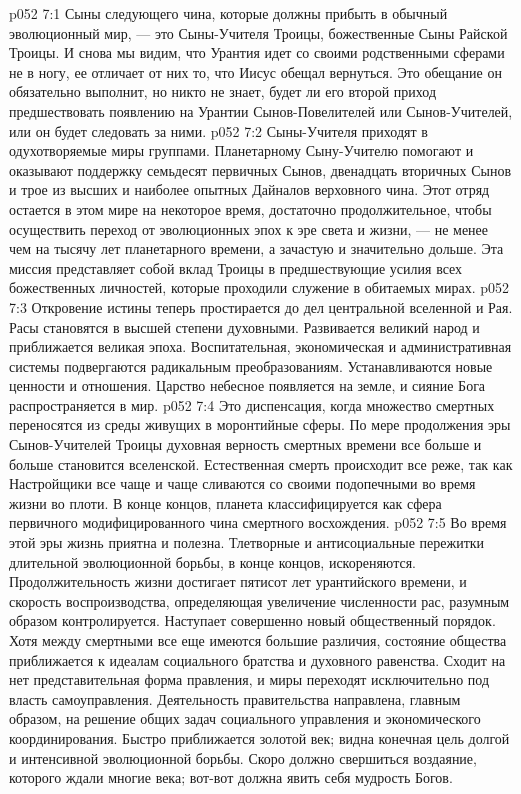 \vs p052 7:1 Сыны следующего чина, которые должны прибыть в обычный эволюционный мир, --- это Сыны\hyp{}Учителя Троицы, божественные Сыны Райской Троицы. И снова мы видим, что Урантия идет со своими родственными сферами не в ногу, ее отличает от них то, что Иисус обещал вернуться. Это обещание он обязательно выполнит, но никто не знает, будет ли его второй приход предшествовать появлению на Урантии Сынов\hyp{}Повелителей или Сынов\hyp{}Учителей, или он будет следовать за ними.
\vs p052 7:2 Сыны\hyp{}Учителя приходят в одухотворяемые миры группами. Планетарному Сыну\hyp{}Учителю помогают и оказывают поддержку семьдесят первичных Сынов, двенадцать вторичных Сынов и трое из высших и наиболее опытных Дайналов верховного чина. Этот отряд остается в этом мире на некоторое время, достаточно продолжительное, чтобы осуществить переход от эволюционных эпох к эре света и жизни, --- не менее чем на тысячу лет планетарного времени, а зачастую и значительно дольше. Эта миссия представляет собой вклад Троицы в предшествующие усилия всех божественных личностей, которые проходили служение в обитаемых мирах.
\vs p052 7:3 \pc Откровение истины теперь простирается до дел центральной вселенной и Рая. Расы становятся в высшей степени духовными. Развивается великий народ и приближается великая эпоха. Воспитательная, экономическая и административная системы подвергаются радикальным преобразованиям. Устанавливаются новые ценности и отношения. Царство небесное появляется на земле, и сияние Бога распространяется в мир.
\vs p052 7:4 Это диспенсация, когда множество смертных переносятся из среды живущих в моронтийные сферы. По мере продолжения эры Сынов\hyp{}Учителей Троицы духовная верность смертных времени все больше и больше становится вселенской. Естественная смерть происходит все реже, так как Настройщики все чаще и чаще сливаются со своими подопечными во время жизни во плоти. В конце концов, планета классифицируется как сфера первичного модифицированного чина смертного восхождения.
\vs p052 7:5 \pc Во время этой эры жизнь приятна и полезна. Тлетворные и антисоциальные пережитки длительной эволюционной борьбы, в конце концов, искореняются. Продолжительность жизни достигает пятисот лет урантийского времени, и скорость воспроизводства, определяющая увеличение численности рас, разумным образом контролируется. Наступает совершенно новый общественный порядок. Хотя между смертными все еще имеются большие различия, состояние общества приближается к идеалам социального братства и духовного равенства. Сходит на нет представительная форма правления, и миры переходят исключительно под власть самоуправления. Деятельность правительства направлена, главным образом, на решение общих задач социального управления и экономического координирования. Быстро приближается золотой век; видна конечная цель долгой и интенсивной эволюционной борьбы. Скоро должно свершиться воздаяние, которого ждали многие века; вот\hyp{}вот должна явить себя мудрость Богов.
